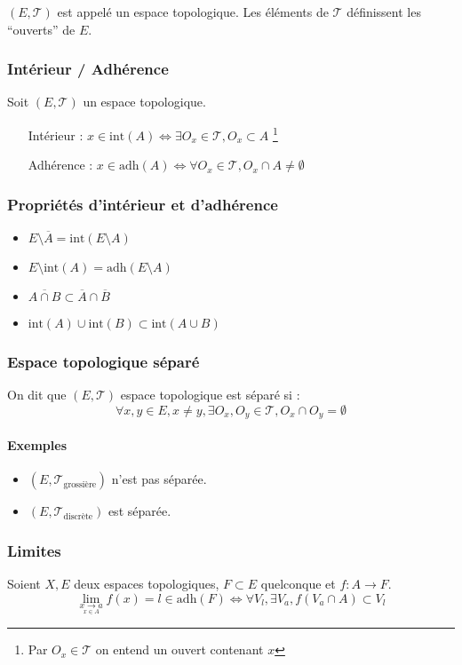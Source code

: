 \documentclass[a4paper,10pt]{article}
\newcommand{\ap}{ \to} %
\newcommand{\adh}[1]{\mathrm{adh}\left( #1\right)}
\newcommand{\eint}[1]{\mathrm{int}\left( #1\right)}
\newcommand{\mfootnote}[1]{\up{(}\footnote{#1}\up{)}}
\begin{document}
   $(E,\mathcal{T})$ est appel\'e un espace topologique. Les \'el\'ements de $\mathcal{T}$ d\'efinissent les ``ouverts'' de $E$.

  \subsubsection{Int\'erieur / Adh\'erence}
   Soit $(E, \mathcal{T})$ un espace topologique.
   \begin{itemize}
     \item[Int\'erieur :] $x \in \eint{A} \iff \exists O_x \in \mathcal{T}, O_x \subset A$
       \mfootnote{Par $O_x \in \mathcal{T}$ on entend un ouvert contenant $x$}
     \item[Adh\'erence :] $x \in \adh{A} \iff \forall O_x \in \mathcal{T}, O_x \cap A \ne \emptyset$
   \end{itemize}

  \subsubsection{Propri\'et\'es d'int\'erieur et d'adh\'erence}
   \begin{itemize}
     \item $E \setminus \overline{A} = \eint{E\setminus A}$
     \item $E \setminus \eint{A} = \adh{E \setminus A}$
     \item $\overline{A \cap B} \subset \overline{A}\cap \overline{B}$
     \item $\eint{A} \cup \eint{B} \subset \eint{A \cup B}$
   \end{itemize}

  \subsubsection{Espace topologique s\'epar\'e}
   On dit que $(E, \mathcal{T})$ espace topologique est s\'epar\'e si : 
   $$\forall x,y \in E, x \ne y, \exists O_x, O_y \in \mathcal{T}, O_x \cap O_y = \emptyset$$

   \paragraph{Exemples}
    \begin{itemize}
      \item $(E, \mathcal{T}_{\mbox{grossi\`ere}})$ n'est pas s\'epar\'ee.
      \item $(E, \mathcal{T}_{\mbox{discr\`ete}})$ est s\'epar\'ee.
    \end{itemize}

  \subsubsection{Limites}
   Soient $X,E$ deux espaces topologiques, $F \subset E$ quelconque et $f: A \ap F$.
   $$\lim_{\underset{x \in A}{x \ap a}}{f(x)}=l \in \adh{F} \iff \forall V_l, \exists V_a, f(V_a \cap A) \subset V_l$$
\end{document}
